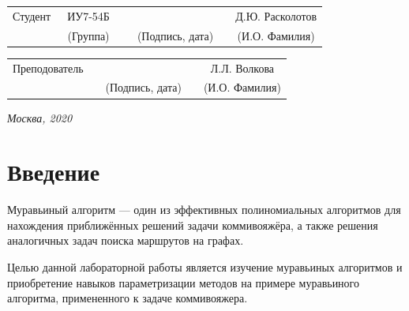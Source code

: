\documentclass[12pt]{report}
\begin{document}
\begin{titlepage}
\noindent
{}
\\

\noindent
{}
\\

\vspace{1.5cm}
\noindent
\begin{tabular}{l c c c c c}
	Студент      & ~ИУ7-54Б~               & \hspace{3.5cm} & \hspace{2cm}                 & &  Д.Ю. Расколотов \\\cline{2-2}\cline{4-4} \cline{6-6} 
	\hspace{3cm} & {\footnotesize(Группа)} &                & {\footnotesize(Подпись, дата)} & & {\footnotesize(И.О. Фамилия)}
\end{tabular}

\noindent
\begin{tabular}{l c c c c}
	Преподователь & \hspace{6cm}   & \hspace{2cm}                 & & Л.Л. Волкова\\\cline{3-3} \cline{5-5} 
	\hspace{3cm}  &                & {\footnotesize(Подпись, дата)} & & {\footnotesize(И.О. Фамилия)}
\end{tabular}

\vspace{0.6cm}
\begin{center}	
	\vfill
	\large \textit {Москва, 2020}
\end{center}

\thispagestyle {empty}
\pagebreak
\end{titlepage}

\tableofcontents

\newpage
\chapter*{Введение}
Муравьиный алгоритм — один из эффективных полиномиальных алгоритмов для нахождения приближённых решений задачи коммивояжёра, а также решения аналогичных задач поиска маршрутов на графах.

Целью данной лабораторной работы является изучение муравьиных алгоритмов и приобретение навыков параметризации методов на примере муравьиного алгоритма, примененного к задаче коммивояжера.
\end{document}
